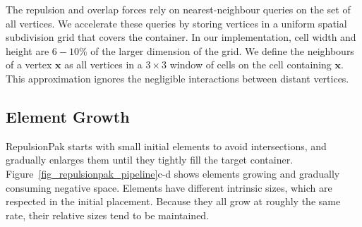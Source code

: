 
The repulsion and overlap forces rely on nearest-neighbour queries on the
set of all vertices.  We accelerate these queries by storing vertices in a
uniform spatial subdivision grid that covers the container.  In our
implementation, cell width and height are $6-10$\% of the larger dimension
of the grid.  
We define the neighbours of a vertex $\bm{x}$ as
all vertices in a $3\times 3$ window of cells  on the cell
containing $\bm{x}$. 
This approximation ignores the negligible interactions between
distant vertices.



\subsection{Element Growth}
\label{repulsionpak_element_growth}

RepulsionPak starts with small initial elements to avoid intersections,
and gradually enlarges them until they tightly fill the target
container.  Figure~\ref{fig_repulsionpak_pipeline}c-d shows elements growing and gradually
consuming negative space.  Elements have different intrinsic sizes, which are
respected in the initial placement.  Because they all grow at roughly the
same rate, their relative sizes tend to be maintained.


